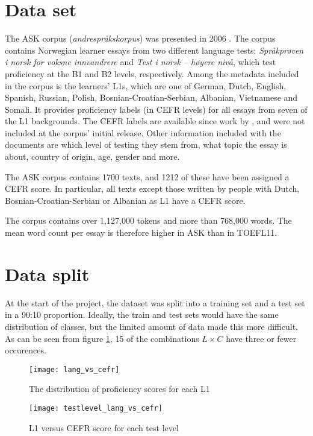 \section{Data set}

The ASK corpus (\emph{andrespråkskorpus}) was presented in 2006
\autocite{tenfjord06}. The corpus contains Norwegian learner essays from two
different language tests: \emph{Språkprøven i norsk for voksne innvandrere}
and \emph{Test i norsk – høyere nivå}, which test proficiency at the B1 and B2
levels, respectively. Among the metadata included in the corpus
is the learners' L1s, which
are one of German, Dutch, English, Spanish, Russian, Polish,
Bosnian-Croatian-Serbian, Albanian, Vietnamese and Somali. It
provides proficiency labels (in CEFR levels) for all essays from seven of the
L1 backgrounds. The CEFR labels are available since work by
\textcite{carlsen2012proficiency}, and were not included at the corpus'
initial release. Other information included with the documents are which level
of testing they stem from, what topic the essay is about, country of origin, age,
gender and more.

The ASK corpus contains 1700 texts, and 1212 of these have been assigned a
CEFR score. In particular, all texts except those written by people with
Dutch, Bosnian-Croatian-Serbian or Albanian as L1 have a CEFR score.

The corpus contains over 1,127,000 tokens and more than 768,000 words. The
mean word count per essay is therefore higher in ASK than in TOEFL11.


\section{Data split}

At the start of the project, the dataset was split into a training set and a
test set in a 90:10 proportion. Ideally, the train and test sets would have
the same distribution of classes, but the limited amount of data made this
more difficult. As can be seen from figure \ref{lang-vs-cefr}, 15 of the
combinations \(L\times C\) have three or fewer occurences.

\begin{figure}
  \centering
  \texttt{[image: lang\_vs\_cefr]}
  \caption{The distribution of proficiency scores for each L1}
  \label{lang-vs-cefr}
\end{figure}
 
\begin{figure}
  \centering
  \texttt{[image: testlevel\_lang\_vs\_cefr]}
  \caption{L1 versus CEFR score for each test level}
  \label{testlevel-lang-vs-cefr}
\end{figure}
 
